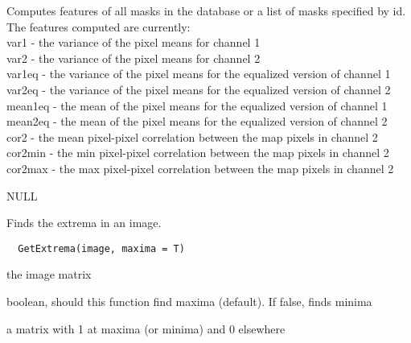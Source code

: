 \documentclass[a4paper]{book}
\begin{document}
\begin{Details}\relax
Computes features of all masks in the database or a list
of masks specified by id.  The features computed are
currently:\\{} var1 - the variance of the pixel means for
channel 1 \\{} var2 - the variance of the pixel means for
channel 2\\{} var1eq - the variance of the pixel means for
the equalized version of channel 1\\{} var2eq - the
variance of the pixel means for the equalized version of
channel 2\\{} mean1eq - the mean of the pixel means for
the equalized version of channel 1\\{} mean2eq - the mean
of the pixel means for the equalized version of channel
2\\{} cor2 - the mean pixel-pixel correlation between the
map pixels in channel 2\\{} cor2min - the min pixel-pixel
correlation between the map pixels in channel 2\\{}
cor2max - the max pixel-pixel correlation between the map
pixels in channel 2\\{}
\end{Details}
%
\begin{Value}
NULL
\end{Value}
%
\begin{Description}\relax
Finds the extrema in an image.
\end{Description}
%
\begin{Usage}
\begin{verbatim}
  GetExtrema(image, maxima = T)
\end{verbatim}
\end{Usage}
%
\begin{Arguments}
\begin{ldescription}
\item[\code{image}] the image matrix

\item[\code{maxima}] boolean, should this function find maxima
(default).  If false, finds minima
\end{ldescription}
\end{Arguments}
%
\begin{Value}
a matrix with 1 at maxima (or minima) and 0 elsewhere
\end{Value}
\end{document}
